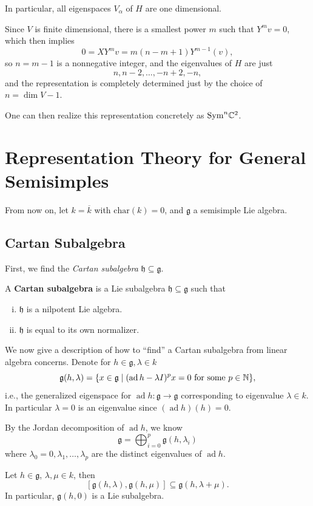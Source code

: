 \documentclass[12pt]{article}
\newcommand{\fg}{\mathfrak{g}}
\newcommand{\fh}{\mathfrak{h}}
\DeclareMathOperator{\ad}{ad}
\begin{document}
In particular, all eigenspaces $V_\alpha$ of $H$ are one dimensional.

Since $V$ is finite dimensional, there is a smallest power $m$ such that $Y^m v = 0$, which then implies
\[0 = XY^m v = m(n-m+1) Y^{m-1}(v),\]
so $n=m-1$ is a nonnegative integer, and the eigenvalues of $H$ are just
\[n,n-2,\dots,-n+2,-n,\]
and the representation is completely determined just by the choice of $n = \dim V - 1$.

One can then realize this representation concretely as $\mathrm{Sym}^n \mathbb{C}^2$.

\section{Representation Theory for General Semisimples}

From now on, let $k=\overline{k}$ with $\mathrm{char}(k)=0$, and $\fg$ a semisimple Lie algebra.

\subsection{Cartan Subalgebra}
First, we find the \textit{Cartan subalgebra} $\fh \subseteq \fg$.

\begin{defn}
    A \textbf{Cartan subalgebra} is a Lie subalgebra $\fh \subseteq \fg$ such that
    \begin{enumerate}[(i)]
        \item $\fh$ is a nilpotent Lie algebra.
        \item $\fh$ is equal to its own normalizer.
    \end{enumerate}
\end{defn}

We now give a description of how to ``find'' a Cartan subalgebra from linear algebra concerns. Denote for $h \in \fg, \lambda\in k$
\[\fg(h,\lambda) = \{x\in \fg \mid (\ad h - \lambda I)^p x = 0 \text{ for some } p\in \N\},\]
i.e., the generalized eigenspace for $\ad h: \fg \to \fg$ corresponding to eigenvalue $\lambda\in k$. In particular $\lambda=0$ is an eigenvalue since $(\ad h)(h)=0$.

By the Jordan decomposition of $\ad h$, we know
\[\fg = \bigoplus_{i=0}^p \fg(h,\lambda_i)\]
where $\lambda_0=0,\lambda_1,\dots,\lambda_p$ are the distinct eigenvalues of $\ad h$.

\begin{prop}
    Let $h\in \fg$, $\lambda,\mu \in k$, then
    \[[\fg(h,\lambda),\fg(h,\mu)] \subseteq \fg(h,\lambda + \mu).\]
    In particular, $\fg(h,0)$ is a Lie subalgebra.
\end{prop}
\end{document}
